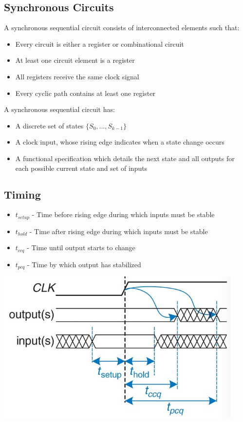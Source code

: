 \documentclass{article}[18pt]
\begin{document}
\subsection{Synchronous Circuits}
A synchronous sequential circuit consists of interconnected elements such that:
\begin{itemize}
	\item Every circuit is either a register or combinational circuit
	\item At least one circuit element is a register
	\item All registers receive the same clock signal
	\item Every cyclic path contains at least one register
\end{itemize}
A synchronous sequential circuit has:
\begin{itemize}
	\item A discrete set of states $\{S_0,...,S_{k-1}\}$
	\item A clock input, whose rising edge indicates when a state change occurs
	\item A functional specification which details the next state and all outputs for each possible current state and set of inputs
\end{itemize}
\subsection{Timing}
\begin{itemize}
	\item $t_{setup}$ - Time before rising edge during which inputs must be stable
	\item $t_{hold}$ - Time after rising edge during which inputs must be stable
	\item $t_{ccq}$ - Time until output starts to change
	\item $t_{pcq}$ - Time by which output has stabilized
\end{itemize}
\begin{center}
	\includegraphics[scale=0.7]{Timing}
\end{center}
\end{document}
